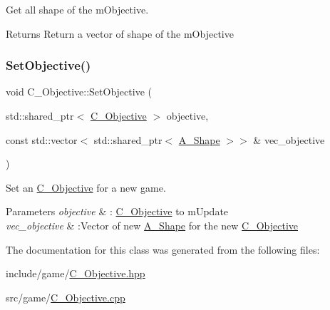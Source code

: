Get all shape of the m\+Objective. 

\begin{DoxyReturn}{Returns}
Return a vector of shape of the m\+Objective 
\end{DoxyReturn}
\mbox{\label{classC__Objective_a931d916840c73104815dbf529f9c866c}} 
\subsubsection{\texorpdfstring{Set\+Objective()}{SetObjective()}}
{\footnotesize\ttfamily void C\+\_\+\+Objective\+::\+Set\+Objective (\begin{DoxyParamCaption}\item[{std\+::shared\+\_\+ptr$<$ \hyperlink{classC__Objective}{C\+\_\+\+Objective} $>$}]{objective,  }\item[{const std\+::vector$<$ std\+::shared\+\_\+ptr$<$ \hyperlink{classA__Shape}{A\+\_\+\+Shape} $>$$>$ \&}]{vec\+\_\+objective }\end{DoxyParamCaption})\hspace{0.3cm}{\ttfamily [static]}}



Set an \hyperlink{classC__Objective}{C\+\_\+\+Objective} for a new game. 


\begin{DoxyParams}{Parameters}
{\em objective} & \+: \hyperlink{classC__Objective}{C\+\_\+\+Objective} to m\+Update \\
\hline
{\em vec\+\_\+objective} & \+:Vector of new \hyperlink{classA__Shape}{A\+\_\+\+Shape} for the new \hyperlink{classC__Objective}{C\+\_\+\+Objective} \\
\hline
\end{DoxyParams}


The documentation for this class was generated from the following files\+:\begin{DoxyCompactItemize}
\item 
include/game/\hyperlink{C__Objective_8hpp}{C\+\_\+\+Objective.\+hpp}\item 
src/game/\hyperlink{C__Objective_8cpp}{C\+\_\+\+Objective.\+cpp}\end{DoxyCompactItemize}
